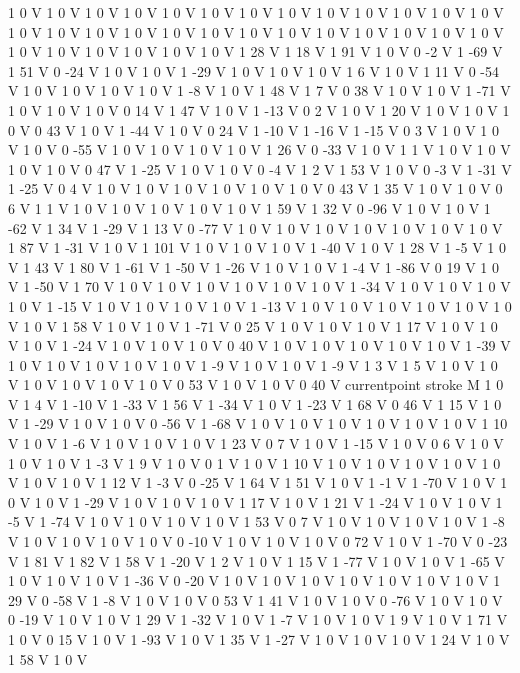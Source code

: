 {{1 0 V
1 0 V
1 0 V
1 0 V
1 0 V
1 0 V
1 0 V
1 0 V
1 0 V
1 0 V
1 0 V
1 0 V
1 0 V
1 0 V
1 0 V
1 0 V
1 0 V
1 0 V
1 0 V
1 0 V
1 0 V
1 0 V
1 0 V
1 0 V
1 0 V
1 0 V
1 0 V
1 0 V
1 0 V
1 0 V
1 0 V
1 0 V
1 28 V
1 18 V
1 91 V
1 0 V
0 -2 V
1 -69 V
1 51 V
0 -24 V
1 0 V
1 0 V
1 -29 V
1 0 V
1 0 V
1 0 V
1 6 V
1 0 V
1 11 V
0 -54 V
1 0 V
1 0 V
1 0 V
1 0 V
1 -8 V
1 0 V
1 48 V
1 7 V
0 38 V
1 0 V
1 0 V
1 -71 V
1 0 V
1 0 V
1 0 V
0 14 V
1 47 V
1 0 V
1 -13 V
0 2 V
1 0 V
1 20 V
1 0 V
1 0 V
1 0 V
0 43 V
1 0 V
1 -44 V
1 0 V
0 24 V
1 -10 V
1 -16 V
1 -15 V
0 3 V
1 0 V
1 0 V
1 0 V
0 -55 V
1 0 V
1 0 V
1 0 V
1 0 V
1 26 V
0 -33 V
1 0 V
1 1 V
1 0 V
1 0 V
1 0 V
1 0 V
0 47 V
1 -25 V
1 0 V
1 0 V
0 -4 V
1 2 V
1 53 V
1 0 V
0 -3 V
1 -31 V
1 -25 V
0 4 V
1 0 V
1 0 V
1 0 V
1 0 V
1 0 V
1 0 V
0 43 V
1 35 V
1 0 V
1 0 V
0 6 V
1 1 V
1 0 V
1 0 V
1 0 V
1 0 V
1 0 V
1 59 V
1 32 V
0 -96 V
1 0 V
1 0 V
1 -62 V
1 34 V
1 -29 V
1 13 V
0 -77 V
1 0 V
1 0 V
1 0 V
1 0 V
1 0 V
1 0 V
1 0 V
1 87 V
1 -31 V
1 0 V
1 101 V
1 0 V
1 0 V
1 0 V
1 -40 V
1 0 V
1 28 V
1 -5 V
1 0 V
1 43 V
1 80 V
1 -61 V
1 -50 V
1 -26 V
1 0 V
1 0 V
1 -4 V
1 -86 V
0 19 V
1 0 V
1 -50 V
1 70 V
1 0 V
1 0 V
1 0 V
1 0 V
1 0 V
1 0 V
1 -34 V
1 0 V
1 0 V
1 0 V
1 0 V
1 -15 V
1 0 V
1 0 V
1 0 V
1 0 V
1 -13 V
1 0 V
1 0 V
1 0 V
1 0 V
1 0 V
1 0 V
1 0 V
1 58 V
1 0 V
1 0 V
1 -71 V
0 25 V
1 0 V
1 0 V
1 0 V
1 17 V
1 0 V
1 0 V
1 0 V
1 -24 V
1 0 V
1 0 V
1 0 V
0 40 V
1 0 V
1 0 V
1 0 V
1 0 V
1 0 V
1 -39 V
1 0 V
1 0 V
1 0 V
1 0 V
1 0 V
1 -9 V
1 0 V
1 0 V
1 -9 V
1 3 V
1 5 V
1 0 V
1 0 V
1 0 V
1 0 V
1 0 V
1 0 V
0 53 V
1 0 V
1 0 V
0 40 V
currentpoint stroke M
1 0 V
1 4 V
1 -10 V
1 -33 V
1 56 V
1 -34 V
1 0 V
1 -23 V
1 68 V
0 46 V
1 15 V
1 0 V
1 -29 V
1 0 V
1 0 V
0 -56 V
1 -68 V
1 0 V
1 0 V
1 0 V
1 0 V
1 0 V
1 0 V
1 10 V
1 0 V
1 -6 V
1 0 V
1 0 V
1 0 V
1 23 V
0 7 V
1 0 V
1 -15 V
1 0 V
0 6 V
1 0 V
1 0 V
1 0 V
1 -3 V
1 9 V
1 0 V
0 1 V
1 0 V
1 10 V
1 0 V
1 0 V
1 0 V
1 0 V
1 0 V
1 0 V
1 0 V
1 12 V
1 -3 V
0 -25 V
1 64 V
1 51 V
1 0 V
1 -1 V
1 -70 V
1 0 V
1 0 V
1 0 V
1 -29 V
1 0 V
1 0 V
1 0 V
1 17 V
1 0 V
1 21 V
1 -24 V
1 0 V
1 0 V
1 -5 V
1 -74 V
1 0 V
1 0 V
1 0 V
1 0 V
1 53 V
0 7 V
1 0 V
1 0 V
1 0 V
1 0 V
1 -8 V
1 0 V
1 0 V
1 0 V
1 0 V
0 -10 V
1 0 V
1 0 V
1 0 V
0 72 V
1 0 V
1 -70 V
0 -23 V
1 81 V
1 82 V
1 58 V
1 -20 V
1 2 V
1 0 V
1 15 V
1 -77 V
1 0 V
1 0 V
1 -65 V
1 0 V
1 0 V
1 0 V
1 -36 V
0 -20 V
1 0 V
1 0 V
1 0 V
1 0 V
1 0 V
1 0 V
1 0 V
1 29 V
0 -58 V
1 -8 V
1 0 V
1 0 V
0 53 V
1 41 V
1 0 V
1 0 V
0 -76 V
1 0 V
1 0 V
0 -19 V
1 0 V
1 0 V
1 29 V
1 -32 V
1 0 V
1 -7 V
1 0 V
1 0 V
1 9 V
1 0 V
1 71 V
1 0 V
0 15 V
1 0 V
1 -93 V
1 0 V
1 35 V
1 -27 V
1 0 V
1 0 V
1 0 V
1 24 V
1 0 V
1 58 V
1 0 V
}}
